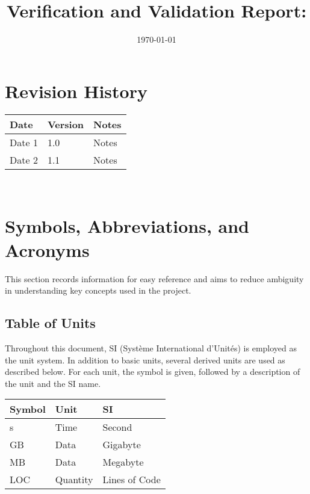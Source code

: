 \documentclass[12pt, titlepage]{article}
\begin{document}
\title{Verification and Validation Report: \progname} 
\author{\authname}
\date{\today}
	
\maketitle


\section{Revision History}

\begin{tabularx}{\textwidth}{p{3cm}p{2cm}X}
\toprule {\bf Date} & {\bf Version} & {\bf Notes}\\
\midrule
Date 1 & 1.0 & Notes\\
Date 2 & 1.1 & Notes\\
\bottomrule
\end{tabularx}

~\newpage

\section{Symbols, Abbreviations, and Acronyms}
This section records information for easy reference and aims to reduce ambiguity in understanding key concepts used in the project.

\subsection{Table of Units}

Throughout this document, SI (Système International d'Unités) is employed as the unit system. In addition to basic units, several derived units are used as described below. For each unit, the symbol is given, followed by a description of the unit and the SI name.

\renewcommand{\arraystretch}{1.2}
\noindent \begin{tabular}{l l l} 
    \toprule		
    \textbf{Symbol} & \textbf{Unit} & \textbf{SI}\\
    \midrule 
    \si{s} & Time & Second\\
    \si{GB} & Data & Gigabyte\\
    \si{MB} & Data & Megabyte\\
    \si{LOC} & Quantity & Lines of Code\\
    \bottomrule
\end{tabular}
\end{document}
